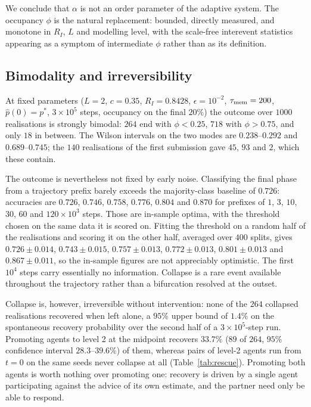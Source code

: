 \documentclass[aps,pre,twocolumn,superscriptaddress,floatfix,longbibliography]{revtex4-2}
\begin{document}
We conclude that $\alpha$ is not an order parameter of the adaptive system. The
occupancy $\phi$ is the natural replacement: bounded, directly measured, and
monotone in $R_I$, $L$ and modelling level, with the scale-free interevent
statistics appearing as a symptom of intermediate $\phi$ rather than as its
definition.

\subsection{Bimodality and irreversibility}
\label{sec:bimodality}

At fixed parameters ($L=2$, $c=0.35$, $R_I=0.8428$, $\epsilon=10^{-2}$,
$\tau_{\rm mem}=200$, $\hat p(0)=p^{*}$, $3\times10^{5}$ steps, occupancy
on the final $20\%$) the outcome over $1000$ realisations is
strongly bimodal: $264$ end with $\phi<0.25$,
$718$ with $\phi>0.75$, and only $18$ in
between. The Wilson intervals on the two modes are $0.238$--$0.292$ and
$0.689$--$0.745$; the $140$ realisations of the first submission gave
$45$, $93$ and $2$, which these contain.

The outcome is nevertheless not fixed by early noise. Classifying the final
phase from a trajectory prefix barely exceeds the majority-class baseline of
$0.726$: accuracies are $0.726$, $0.746$, $0.758$,
$0.776$, $0.804$ and $0.870$
for prefixes of $1$, $3$, $10$, $30$, $60$ and $120\times10^3$ steps.
Those are in-sample optima, with the threshold chosen on the same data it
is scored on. Fitting the threshold on a random half of the realisations and
scoring it on the other half, averaged over $400$ splits, gives
$0.726\pm0.014$, $0.743\pm0.015$, $0.757\pm0.013$, $0.772\pm0.013$,
$0.801\pm0.013$ and $0.867\pm0.011$, so the in-sample figures are not
appreciably optimistic. The first
$10^4$ steps carry essentially no information. Collapse is a rare event
available throughout the trajectory rather than a bifurcation resolved at the
outset.

Collapse is, however, irreversible without intervention: none of the
$264$
collapsed realisations recovered when left alone, a $95\%$ upper bound of
$1.4\%$ on the spontaneous recovery probability over the second half of a
$3\times10^{5}$-step run. Promoting agents to level 2 at
the midpoint recovers $33.7\%$ ($89$ of $264$, $95\%$ confidence interval
$28.3$--$39.6\%$) of them, whereas pairs of level-2 agents run
from $t=0$ on the same seeds never collapse at all (Table~\ref{tab:rescue}).
Promoting both agents is worth nothing over promoting one: recovery is driven by
a single agent participating against the advice of its own estimate, and the
partner need only be able to respond.
\end{document}
